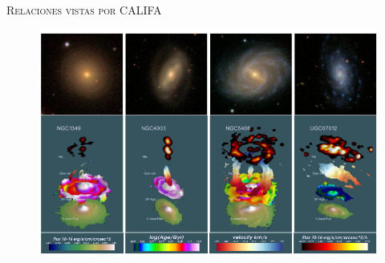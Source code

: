 \documentclass[xcolor=dvipsnames,4pt,hyperref={colorlinks,citecolor=black,linkcolor=black,urlcolor=black}]{beamer}
\begin{document}
\begin{frame}{\textsc{Relaciones vistas por CALIFA}}
%
\begin{figure}
\includegraphics[scale=1]{img/husemann2013-20}
\end{figure}
%
\end{frame}
\end{document}
